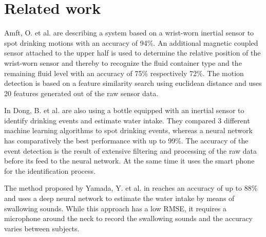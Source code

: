 \section{Related work}
Amft, O. et al. \cite{5470653} are describing a system based on a wrist-worn inertial sensor to spot drinking motions with an accuracy of 94\%. An additional magnetic coupled sensor attached to the upper half is used to determine the relative position of the wrist-worn sensor and thereby to recognize the fluid container type and the remaining fluid level with an accuracy of 75\% respectively 72\%. The motion detection is based on a feature similarity search using euclidean distance and uses 20 features generated out of the raw sensor data.

In \cite{7038937} Dong, B. et al. are also using a bottle equipped with an inertial sensor to identify drinking events and estimate water intake. They compared 3 different machine learning algorithms to spot drinking events, whereas a neural network has comparatively the best performance with up to 99\%. The accuracy of the event detection is the result of extensive filtering and processing of the raw data before its feed to the neural network. At the same time it uses the smart phone for the identification process.

The method proposed by Yamada, Y. et al. in \cite{8229307} reaches an accuracy of up to 88\% and uses a deep neural network to estimate the water intake by means of swallowing sounds. While this approach has a low RMSE, it requires a microphone around the neck to record the swallowing sounds and the accuracy varies between subjects.